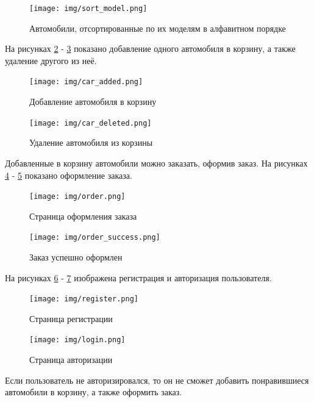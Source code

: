 \documentclass[a4paper,14pt, unknownkeysallowed]{extreport}
\begin{document}
\begin{figure}[h]
	\centering
	\texttt{[image: img/sort\_model.png]}
	\caption{Автомобили, отсортированные по их моделям в алфавитном порядке}
	\label{fig:sort_model}
\end{figure} 

\clearpage

На рисунках \ref{fig:car_added} - \ref{fig:car_deleted} показано добавление одного автомобиля в корзину, а также удаление другого из неё.

\begin{figure}[h]
	\centering
	\texttt{[image: img/car\_added.png]}
	\caption{Добавление автомобиля в корзину}
	\label{fig:car_added}
\end{figure} 

\begin{figure}[h]
	\centering
	\texttt{[image: img/car\_deleted.png]}
	\caption{Удаление автомобиля из корзины}
	\label{fig:car_deleted}
\end{figure} 

\clearpage

Добавленные в корзину автомобили можно заказать, оформив заказ. На рисунках \ref{fig:order} - \ref{fig:order_success} показано оформление заказа.

\begin{figure}[h]
	\centering
	\texttt{[image: img/order.png]}
	\caption{Страница оформления заказа}
	\label{fig:order}
\end{figure} 

\begin{figure}[h]
	\centering
	\texttt{[image: img/order\_success.png]}
	\caption{Заказ успешно оформлен}
	\label{fig:order_success}
\end{figure} 

\clearpage

На рисунках \ref{fig:register} - \ref{fig:login} изображена регистрация и авторизация пользователя.

\begin{figure}[h]
	\centering
	\texttt{[image: img/register.png]}
	\caption{Страница регистрации}
	\label{fig:register}
\end{figure} 

\begin{figure}[h]
	\centering
	\texttt{[image: img/login.png]}
	\caption{Страница авторизации}
	\label{fig:login}
\end{figure} 

Если пользователь не авторизировался, то он не сможет добавить понравившиеся автомобили в корзину, а также оформить заказ.
\end{document}
